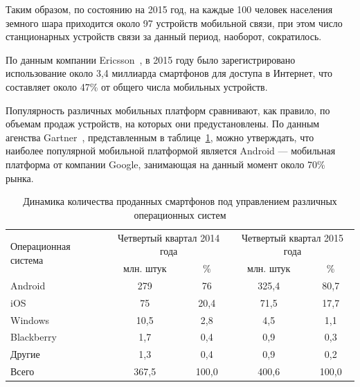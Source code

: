 Таким образом, по состоянию на 2015 год, на каждые 100 человек
населения земного шара приходится около 97 устройств мобильной связи,
при этом число станционарных устройств связи за данный период,
наоборот, сократилось.

По данным компании Ericsson~\cite{ericsson_mobility_report},
в 2015 году было зарегистрировано использование около 3{,}4
миллиарда смартфонов для доступа в Интернет,
что составляет около 47\% от общего числа мобильных устройств.

Популярность различных мобильных платформ сравнивают, как правило,
по объемам продаж устройств, на которых они предустановлены.
По данным агенства Gartner~\cite{gartner_smartphone_stat}, представленным
в таблице~\ref{tbl:gartner_platform_stat}, можно утверждать, что наиболее популярной
мобильной платформой является Android --- мобильная платформа от
компании Google, занимающая на данный момент около 70\% рынка.

\begin{table} [h!]
  \caption{
    Динамика количества проданных смартфонов под
    управлением различных операционных систем
  }\label{tbl:gartner_platform_stat}
    \begin{tabular}{| m{6.6cm} | c | c | c | c |}
      \hline

      \multirow{2}{*}{
      \parbox{6.6cm}{
      \smallskip
      \centering Операционная система
      \smallskip
      }
      }
      & \multicolumn{2}{c|}{
          \parbox{4.5cm}{
            \smallskip
            \centering Четвертый квартал 2014 года
            \smallskip
          }
        }
      & \multicolumn{2}{c|}{
          \parbox{4.5cm}{
            \smallskip
            \centering Четвертый квартал 2015 года
            \smallskip
          }
        } \\
      \cline{2-5}

      & млн. штук & \% & млн. штук & \% \\
      \hline

      Android &  279 & 76 & 325{,}4 & 80{,}7 \\
      \hline

      iOS &  75 & 20{,}4 & 71{,}5 & 17{,}7 \\
      \hline

      Windows & 10{,}5 & 2{,}8 & 4{,}5 & 1{,}1 \\
      \hline

      Blackberry & 1{,}7 & 0{,}4 & 0{,}9 & 0{,}3 \\
      \hline

      Другие & 1{,}3 & 0{,}4 & 0{,}9 & 0{,}2 \\
      \hline

      Всего & 367{,}5 & 100{,}0 & 400{,}6 & 100{,}0 \\
      \hline
    \end{tabular}
\end{table}

